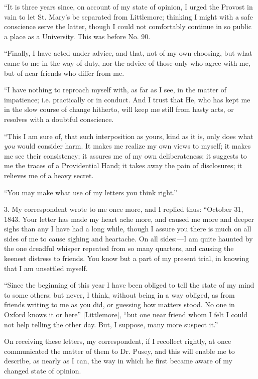 ``It is three years since, on account of my state of opinion, I
urged the Provost in vain to let St. Mary's be separated from Littlemore;
thinking I might with a safe conscience serve the latter, though I could
not comfortably continue in so public a place as a University. This was
before No. 90.

``Finally, I have acted under advice, and that, not of my own
choosing, but what came to me in the way of duty, nor the advice of
those only who agree with me, but of near friends who differ from me.

``I have nothing to reproach myself with, as far as I see, in the
matter of impatience; i.e. practically or in conduct. And I trust that
He, who has kept me in the slow course of change hitherto, will keep me
still from hasty acts, or resolves with a doubtful conscience.

``This I am sure of, that such interposition as yours, kind as it
is, only does what \emph{you} would consider harm. It makes me realize
my own views to myself; it makes me see their consistency; it assures me
of my own deliberateness; it suggests to me the traces of a
Providential Hand; it takes away the pain of disclosures; it relieves me
of a heavy secret.

``You may make what use of my letters you think right.''

3. My correspondent wrote to me once more, and I replied
thus: ``October 31, 1843. Your letter has made my heart ache more,
and caused me more and deeper sighs than any I have had a long while,
though I assure you there is much on all sides of me to cause sighing
and heartache. On all sides:—I am quite haunted by the one
dreadful whisper repeated from so many quarters, and causing the keenest
distress to friends. You know but a part of my present trial, in knowing
that I am unsettled myself.

``Since the beginning of this year I have been obliged to tell
the state of my mind to some others; but never, I think, without being
in a way obliged, as from friends writing to me as you did, or guessing
how matters stood. No one in Oxford knows it or here'' [Littlemore], ``but one
near friend whom I felt I could not
help telling the other day. But, I suppose, many more
suspect it.''

On receiving these letters, my correspondent, if I recollect rightly,
at once communicated the matter of them to Dr. Pusey, and this will
enable me to describe, as nearly as I can, the way in
which he first became aware of my changed state of opinion.

